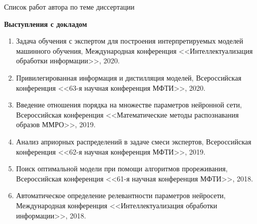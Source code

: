 \documentclass[10pt,pdf,hyperref={unicode}]{beamer}
\begin{document}
\begin{frame}{Список работ автора по теме диссертации}
{\textbf{Выступления с докладом}
\begin{enumerate}
    \item Задача обучения с экспертом для построения интерпретируемых моделей машинного обучения, Международная конференция <<Интеллектуализация обработки информации>>, 2020.
    \item Привилегированная информация и дистилляция моделей, Всероссийская конференция <<63-я научная конференция МФТИ>>, 2020.
    \item Введение отношения порядка на множестве параметров нейронной сети, Всероссийская конференция <<Математические методы распознавания образов ММРО>>, 2019.
    \item Анализ априорных распределений в задаче смеси экспертов, Всероссийская конференция <<62-я научная конференция МФТИ>>, 2019.
    \item Поиск оптимальной модели при помощи алгоритмов прореживания, Всероссийская конференция <<61-я научная конференция МФТИ>>, 2018.
    \item Автоматическое определение релевантности параметров нейросети, Международная конференция <<Интеллектуализация обработки информации>>, 2018.
\end{enumerate}
}
\end{frame}
\end{document}

